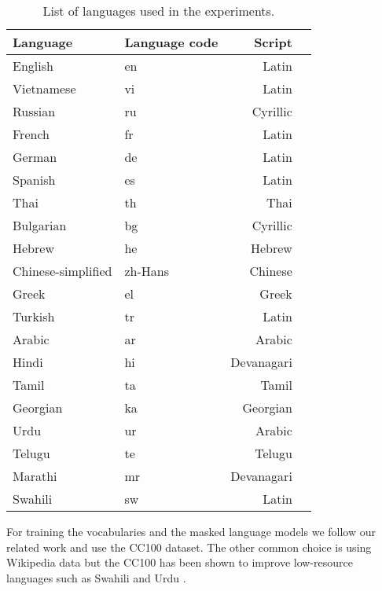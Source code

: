 \begin{table}
    \centering\footnotesize\sf
    \begin{tabular}{llrl}
    \toprule
    Language & Language code & Script \\
    \midrule
    English & en & Latin \\
    Vietnamese & vi & Latin \\
    Russian & ru & Cyrillic \\
    French & fr & Latin \\
    German & de & Latin \\
    Spanish & es & Latin \\
    Thai & th & Thai \\
    Bulgarian & bg & Cyrillic \\
    Hebrew & he & Hebrew \\
    Chinese-simplified & zh-Hans & Chinese \\
    Greek & el & Greek \\
    Turkish & tr & Latin \\
    Arabic & ar & Arabic \\
    Hindi & hi & Devanagari \\
    Tamil & ta & Tamil \\
    Georgian & ka & Georgian \\
    Urdu & ur & Arabic \\
    Telugu & te & Telugu \\
    Marathi & mr & Devanagari \\
    Swahili & sw & Latin \\
    \bottomrule
    \end{tabular}
    \caption{List of languages used in the experiments.  }
    \label{tab:languages}
\end{table}

For training the vocabularies and the masked language models we follow our related work \cite{conneau_unsupervised_2020,chung_improving_2020,liang_xlm-v_2023} and use the CC100 dataset. The other common choice is using Wikipedia data \cite{devlin_bert_2019,zheng_allocating_2021} but the CC100 has been shown to improve low-resource languages such as Swahili and Urdu \cite{conneau_unsupervised_2020}.

